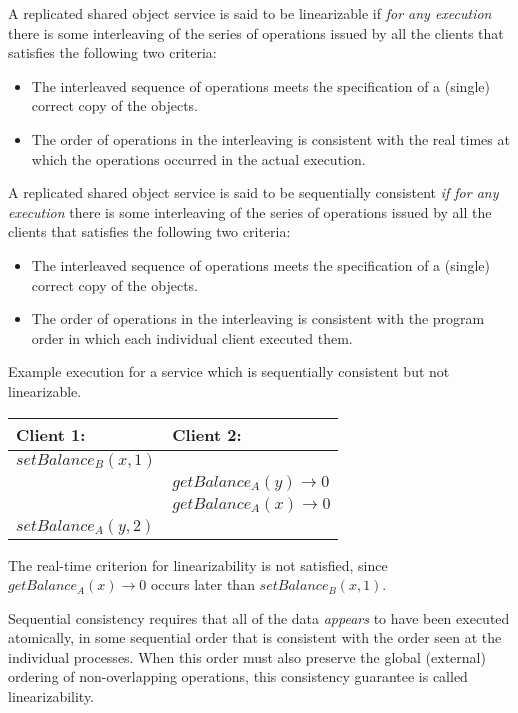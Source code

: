 \documentclass[a4paper]{article}
\newcommand{\solution}[2][]{
  \ifthenelse{\equal{#1}{} \or \equal{#1}{a}}{\\[3pt]\textit{Solution: }\\[0.1cm]}{}
  \parbox[t]{\textwidth}{
    \ifthenelse{\equal{#1}{}}{}{#1)}
    \parbox[t]{0.95\textwidth}{#2}}\\
}
\newcommand{\highlight}[1]{{\color{blue}#1}}
\begin{document}
\solution{
  A replicated shared object service is said to be
  \highlight{linearizable} if \textit{for any execution} there is
  some interleaving of the series of operations issued by all the
  clients that satisfies the following two criteria:
  \begin{itemize}
    \item The interleaved sequence of operations meets the
      specification of a (single) correct copy of the objects.
    \item The order of operations in the interleaving is consistent
      with the \highlight{real times at which the operations
        occurred in the actual execution.}
  \end{itemize}

  A replicated shared object service is said to be
  \highlight{sequentially consistent} \textit{if for any
    execution} there is some interleaving of the series of operations
  issued by all the clients that satisfies the following two criteria:
  \begin{itemize}
    \item The interleaved sequence of operations meets the
      specification of a (single) correct copy of the objects.
    \item The order of operations in the interleaving is consistent
      with the \highlight{program order in which each individual
        client executed them.}
  \end{itemize}

  \begin{center}
    Example execution for a service which is sequentially consistent
    but not linearizable.\\
    \begin{tabular}{| l | l |}\hline
      Client 1: & Client 2: \\\hline
      $setBalance_B(x, 1)$ &\\
      & $getBalance_A(y) \rightarrow 0$\\
      & $getBalance_A(x) \rightarrow 0$\\
      $setBalance_A(y, 2)$ &\\\hline
    \end{tabular}
    The real-time criterion for linearizability is not satisfied,
    since $getBalance_A(x) \rightarrow 0$ occurs later than
    $setBalance_B(x,1)$.\\
  \end{center}

  Sequential consistency requires that all of the data
  \textit{appears} to have been executed atomically, in some sequential
  order that is consistent with the order seen at the individual
  processes. When this order must also preserve the global (external)
  ordering of non-overlapping operations, this consistency guarantee is
  called linearizability.
}
\end{document}
